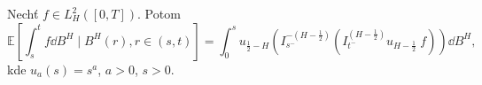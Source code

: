 \begin{tvrz}
    Nechť $f\in L^2_H \left( \left[ 0,T \right] \right)$. Potom
        $$\mathbb{E}\left[\int_s^t f \dd B^H \;|\; B^H (r), r\in \left(s,t\right)\right]
        = \int_0^s u_{\frac{1}{2}-H} \left(I_{s^-}^{-\left(H-\frac{1}{2}\right)} 
        \left(I_{t^-}^{\left(H-\frac{1}{2}\right)} u_{H-\frac{1}{2}}\; f
        \right) \right) \dd B^H, $$
    kde $u_a (s) = s^a$, $a>0$, $s>0$.
\end{tvrz}


